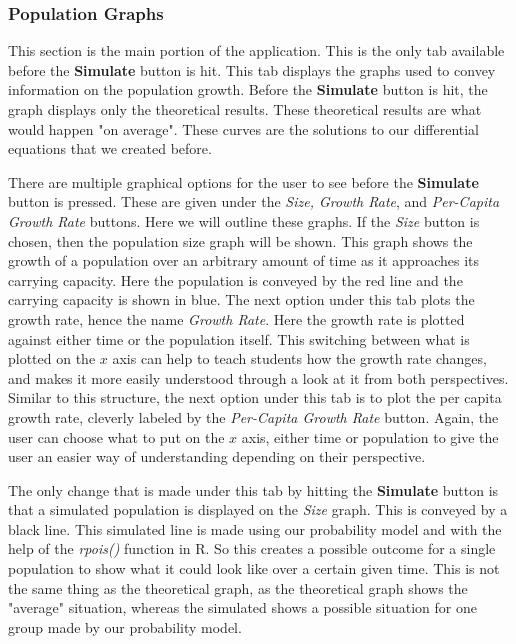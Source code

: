 \documentclass{article}\usepackage[]{graphicx}\usepackage[]{color}
\begin{document}
\subsubsection{Population Graphs}

This section is the main portion of the application. This is the only tab available before the \textbf{Simulate} button is hit. This tab displays the graphs used to convey information on the population growth. Before the \textbf{Simulate} button is hit, the graph displays only the theoretical results. These theoretical results are what would happen "on average". These curves are the solutions to our differential equations that we created before.

There are multiple graphical options for the user to see before the \textbf{Simulate} button is pressed. These are given under the \textit{Size, Growth Rate}, and \textit{Per-Capita Growth Rate} buttons. Here we will outline these graphs. If the \textit{Size} button is chosen, then the population size graph will be shown. This graph shows the growth of a population over an arbitrary amount of time as it approaches its carrying capacity. Here the population is conveyed by the red line and the carrying capacity is shown in blue. The next option under this tab plots the growth rate, hence the name \textit{Growth Rate}. Here the growth rate is plotted against either time or the population itself. This switching between what is plotted on the \(x\) axis can help to teach students how the growth rate changes, and makes it more easily understood through a look at it from both perspectives. Similar to this structure, the next option under this tab is to plot the per capita growth rate, cleverly labeled by the \textit{Per-Capita Growth Rate} button. Again, the user can choose what to put on the \(x\) axis, either time or population to give the user an easier way of understanding depending on their perspective.

The only change that is made under this tab by hitting the \textbf{Simulate} button is that a simulated population is displayed on the \textit{Size} graph. This is conveyed by a black line. This simulated line is made using our probability model and with the help of the \textit{rpois()} function in R. So this creates a possible outcome for a single population to show what it could look like over a certain given time. This is not the same thing as the theoretical graph, as the theoretical graph shows the "average" situation, whereas the simulated shows a possible situation for one group made by our probability model. 
\end{document}
